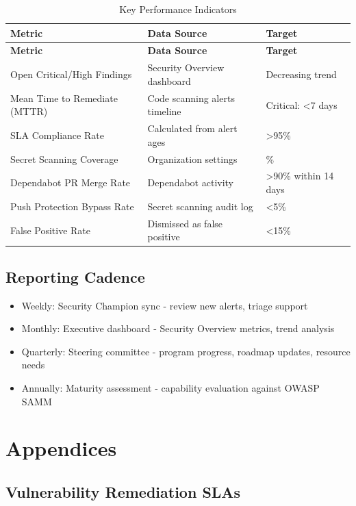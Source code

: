 \documentclass[11pt]{article}
\begin{document}
\begin{longtable}{@{}>{\RaggedRight\arraybackslash}p{}>{\RaggedRight\arraybackslash}p{}>{\RaggedRight\arraybackslash}p{}@{}}
\caption{Key Performance Indicators}\label{tab:kpis}\\
\toprule
\textbf{Metric} & \textbf{Data Source} & \textbf{Target} \\
\midrule
\endfirsthead
\toprule
\textbf{Metric} & \textbf{Data Source} & \textbf{Target} \\
\midrule
\endhead
\bottomrule
\endfoot
Open Critical/High Findings & Security Overview dashboard & Decreasing trend \\
Mean Time to Remediate (MTTR) & Code scanning alerts timeline & Critical: \textless{}7 days \\
SLA Compliance Rate & Calculated from alert ages & \textgreater{}95\% \\
Secret Scanning Coverage & Organization settings & 100\% \\
Dependabot PR Merge Rate & Dependabot activity & \textgreater{}90\% within 14 days \\
Push Protection Bypass Rate & Secret scanning audit log & \textless{}5\% \\
False Positive Rate & Dismissed as false positive & \textless{}15\% \\
\end{longtable}

\subsection{Reporting Cadence}

\begin{itemize}[leftmargin=*]
\item Weekly: Security Champion sync - review new alerts, triage support
\item Monthly: Executive dashboard - Security Overview metrics, trend analysis
\item Quarterly: Steering committee - program progress, roadmap updates, resource needs
\item Annually: Maturity assessment - capability evaluation against OWASP SAMM
\end{itemize}
\section{Appendices}

\subsection{Vulnerability Remediation SLAs}
\end{document}
